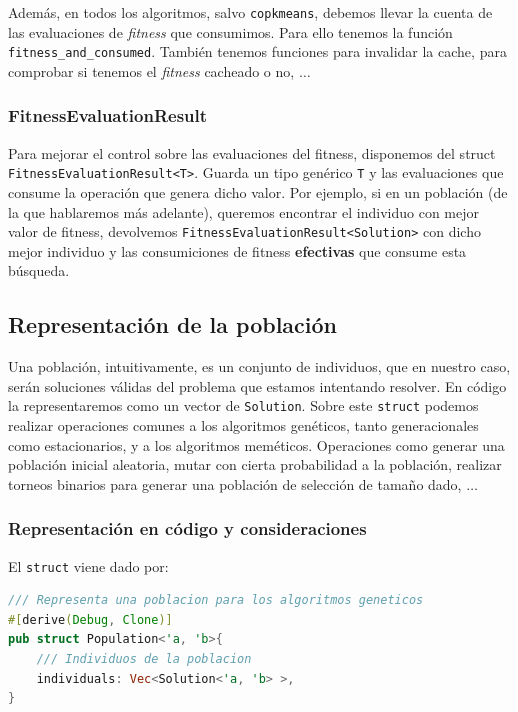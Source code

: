 \documentclass[11pt]{article}
\begin{document}
Además, en todos los algoritmos, salvo \lstinline{copkmeans}, debemos llevar la cuenta de las evaluaciones de \emph{fitness} que consumimos. Para ello tenemos la función \lstinline{fitness_and_consumed}. También tenemos funciones para invalidar la cache, para comprobar si tenemos el \emph{fitness} cacheado o no, $\ldots$

\subsubsection{FitnessEvaluationResult}

Para mejorar el control sobre las evaluaciones del fitness, disponemos del struct  \lstinline{FitnessEvaluationResult<T>}. Guarda un tipo genérico \lstinline{T} y las evaluaciones que consume la operación que genera dicho valor. Por ejemplo, si en un población (de la que hablaremos más adelante), queremos encontrar el individuo con mejor valor de fitness, devolvemos \lstinline{FitnessEvaluationResult<Solution>} con dicho mejor individuo y las consumiciones de fitness \textbf{efectivas} que consume esta búsqueda.

\subsection{Representación de la población}

Una población, intuitivamente, es un conjunto de individuos, que en nuestro caso, serán soluciones válidas del problema que estamos intentando resolver. En código la representaremos como un vector de \lstinline{Solution}. Sobre este \lstinline{struct} podemos realizar operaciones comunes a los algoritmos genéticos, tanto generacionales como estacionarios, y a los algoritmos meméticos. Operaciones como generar una población inicial aleatoria, mutar con cierta probabilidad a la población, realizar  torneos binarios para generar una población de selección de tamaño dado, $\ldots$

\subsubsection{Representación en código y consideraciones}

El \lstinline{struct} viene dado por:

\begin{lstlisting}[language=Rust, style=Boxed]
/// Representa una poblacion para los algoritmos geneticos
#[derive(Debug, Clone)]
pub struct Population<'a, 'b>{
    /// Individuos de la poblacion
    individuals: Vec<Solution<'a, 'b> >,
}
\end{lstlisting}
\end{document}
